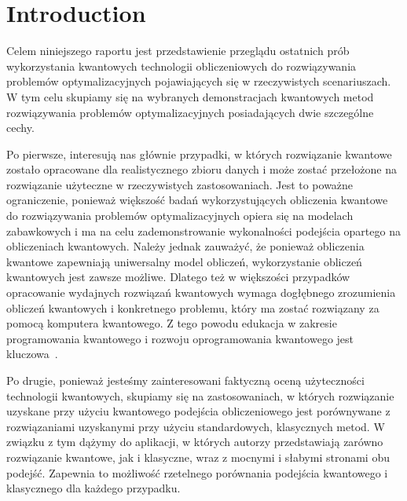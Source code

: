 \documentclass[a4paper,11pt]{article}
\begin{document}

%


\section{Introduction}

Celem niniejszego raportu jest przedstawienie przeglądu ostatnich prób wykorzystania kwantowych technologii obliczeniowych do rozwiązywania problemów optymalizacyjnych pojawiających się w rzeczywistych scenariuszach. W tym celu skupiamy się na wybranych demonstracjach kwantowych metod rozwiązywania problemów optymalizacyjnych posiadających dwie szczególne cechy.

Po pierwsze, interesują nas głównie przypadki, w których rozwiązanie kwantowe zostało opracowane dla realistycznego zbioru danych i może zostać przełożone na rozwiązanie użyteczne w rzeczywistych zastosowaniach. Jest to poważne ograniczenie, ponieważ większość badań wykorzystujących obliczenia kwantowe do rozwiązywania problemów optymalizacyjnych opiera się na modelach zabawkowych i ma na celu zademonstrowanie wykonalności podejścia opartego na obliczeniach kwantowych. Należy jednak zauważyć, że ponieważ obliczenia kwantowe zapewniają uniwersalny model obliczeń, wykorzystanie obliczeń kwantowych jest zawsze możliwe. Dlatego też w większości przypadków opracowanie wydajnych rozwiązań kwantowych wymaga dogłębnego zrozumienia obliczeń kwantowych i konkretnego problemu, który ma zostać rozwiązany za pomocą komputera kwantowego. Z tego powodu edukacja w zakresie programowania kwantowego i rozwoju oprogramowania kwantowego jest kluczowa~\cite{salehi2022computer}.

Po drugie, ponieważ jesteśmy zainteresowani faktyczną oceną użyteczności technologii kwantowych, skupiamy się na zastosowaniach, w których rozwiązanie uzyskane przy użyciu kwantowego podejścia obliczeniowego jest porównywane z rozwiązaniami uzyskanymi przy użyciu standardowych, klasycznych metod. W związku z tym dążymy do aplikacji, w których autorzy przedstawiają zarówno rozwiązanie kwantowe, jak i klasyczne, wraz z mocnymi i słabymi stronami obu podejść. Zapewnia to możliwość rzetelnego porównania podejścia kwantowego i klasycznego dla każdego przypadku. 
\end{document}
